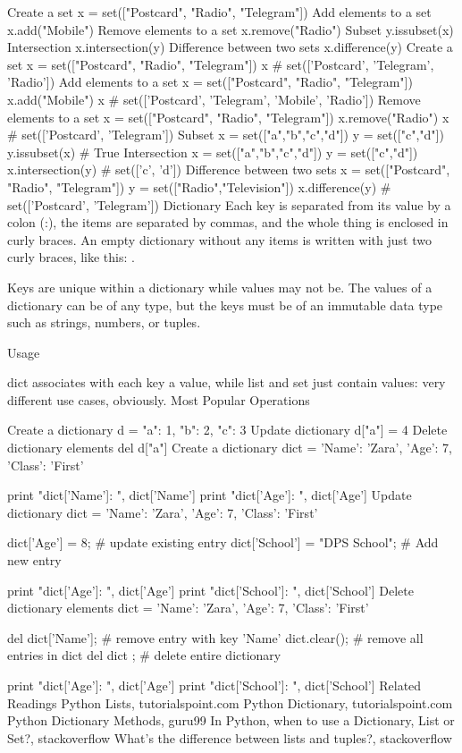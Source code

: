 Create a set
x = set(["Postcard", "Radio", "Telegram"])
Add elements to a set
x.add("Mobile")
Remove elements to a set
x.remove("Radio")
Subset
y.issubset(x)
Intersection
x.intersection(y)
Difference between two sets
x.difference(y)
Create a set
x = set(["Postcard", "Radio", "Telegram"])
x
# set(['Postcard', 'Telegram', 'Radio'])
Add elements to a set
x = set(["Postcard", "Radio", "Telegram"])
x.add("Mobile")
x
# set(['Postcard', 'Telegram', 'Mobile', 'Radio'])
Remove elements to a set
x = set(["Postcard", "Radio", "Telegram"])
x.remove("Radio")
x
# set(['Postcard', 'Telegram'])
Subset
x = set(["a","b","c","d"])
y = set(["c","d"])
y.issubset(x)
# True
Intersection
x = set(["a","b","c","d"])
y = set(["c","d"])
x.intersection(y)
# set(['c', 'd'])
Difference between two sets
x = set(["Postcard", "Radio", "Telegram"])
y = set(["Radio","Television"])
x.difference(y)
# set(['Postcard', 'Telegram'])
Dictionary
Each key is separated from its value by a colon (:), the items are separated by commas, and the whole thing is enclosed in curly braces. An empty dictionary without any items is written with just two curly braces, like this: {}.

Keys are unique within a dictionary while values may not be. The values of a dictionary can be of any type, but the keys must be of an immutable data type such as strings, numbers, or tuples.

Usage

dict associates with each key a value, while list and set just contain values: very different use cases, obviously.
Most Popular Operations

Create a dictionary
d = {"a": 1, "b": 2, "c": 3}
Update dictionary
d["a"] = 4
Delete dictionary elements
del d["a"]
Create a dictionary
dict = {'Name': 'Zara', 'Age': 7, 'Class': 'First'}

print "dict['Name']: ", dict['Name']
print "dict['Age']: ", dict['Age']
Update dictionary
dict = {'Name': 'Zara', 'Age': 7, 'Class': 'First'}

dict['Age'] = 8; # update existing entry
dict['School'] = "DPS School"; # Add new entry


print "dict['Age']: ", dict['Age']
print "dict['School']: ", dict['School']
Delete dictionary elements
dict = {'Name': 'Zara', 'Age': 7, 'Class': 'First'}

del dict['Name']; # remove entry with key 'Name'
dict.clear();     # remove all entries in dict
del dict ;        # delete entire dictionary

print "dict['Age']: ", dict['Age']
print "dict['School']: ", dict['School']
Related Readings
Python Lists, tutorialspoint.com
Python Dictionary, tutorialspoint.com
Python Dictionary Methods, guru99
In Python, when to use a Dictionary, List or Set?, stackoverflow
What's the difference between lists and tuples?, stackoverflow

